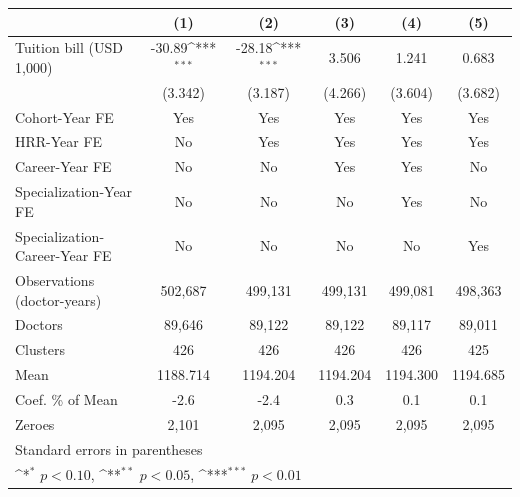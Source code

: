 {
\def\sym#1{\ifmmode^{#1}\else\(^{#1}\)\fi}
\begin{tabular}{l*{5}{c}}
\hline\hline
                    &\multicolumn{1}{c}{(1)}         &\multicolumn{1}{c}{(2)}         &\multicolumn{1}{c}{(3)}         &\multicolumn{1}{c}{(4)}         &\multicolumn{1}{c}{(5)}         \\
\hline
Tuition bill (USD 1,000)&      -30.89\sym{***}&      -28.18\sym{***}&       3.506         &       1.241         &       0.683         \\
                    &     (3.342)         &     (3.187)         &     (4.266)         &     (3.604)         &     (3.682)         \\
[1em]
Cohort-Year FE      &         Yes         &         Yes         &         Yes         &         Yes         &         Yes         \\
[1em]
HRR-Year FE         &          No         &         Yes         &         Yes         &         Yes         &         Yes         \\
[1em]
Career-Year FE      &          No         &          No         &         Yes         &         Yes         &          No         \\
[1em]
Specialization-Year FE&          No         &          No         &          No         &         Yes         &          No         \\
[1em]
Specialization-Career-Year FE&          No         &          No         &          No         &          No         &         Yes         \\
\hline
Observations (doctor-years)&     502,687         &     499,131         &     499,131         &     499,081         &     498,363         \\
Doctors             &      89,646         &      89,122         &      89,122         &      89,117         &      89,011         \\
Clusters            &         426         &         426         &         426         &         426         &         425         \\
Mean                &    1188.714         &    1194.204         &    1194.204         &    1194.300         &    1194.685         \\
Coef. \% of Mean    &        -2.6         &        -2.4         &         0.3         &         0.1         &         0.1         \\
Zeroes              &       2,101         &       2,095         &       2,095         &       2,095         &       2,095         \\
\hline\hline
\multicolumn{6}{l}{\footnotesize Standard errors in parentheses}\\
\multicolumn{6}{l}{\footnotesize \sym{*} \(p<0.10\), \sym{**} \(p<0.05\), \sym{***} \(p<0.01\)}\\
\end{tabular}
}
